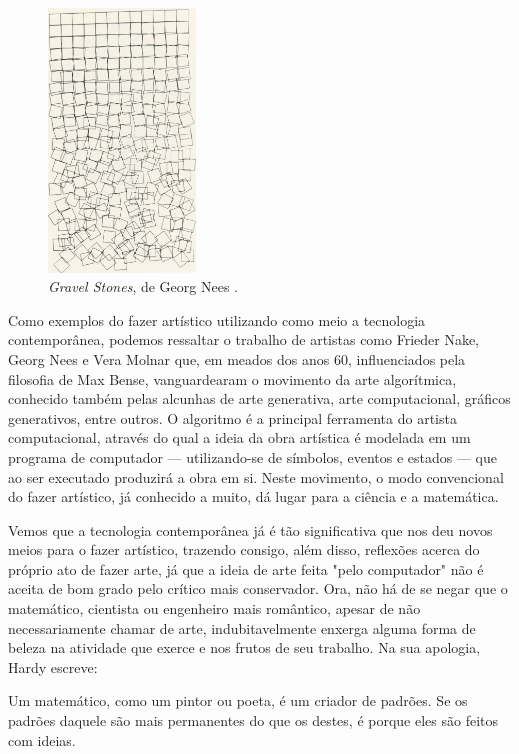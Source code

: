 \documentclass[12pt, a4paper]{article}
\begin{document}
\begin{figure}[ht!]
	\centering
	\includegraphics[width=\textwidth, height=7cm, keepaspectratio=true]{fig/gravel_stones}
	\caption{
		\emph{Gravel Stones}, de Georg Nees
		\cite{gravel_stones}.
	}
\end{figure}

Como exemplos do fazer artístico utilizando como meio a tecnologia contemporânea, podemos ressaltar o trabalho
de artistas como Frieder Nake, Georg Nees e Vera Molnar que, em meados dos anos 60, influenciados pela filosofia de Max Bense, vanguardearam 
o movimento da arte algorítmica, conhecido também pelas alcunhas de arte generativa, arte computacional, gráficos generativos, entre outros.
O algoritmo é a principal ferramenta do artista computacional, através do qual a ideia da obra artística é modelada em um programa de computador --- utilizando-se de símbolos, eventos e estados --- que ao ser executado produzirá a obra em si. Neste movimento, o modo convencional do fazer artístico, já conhecido a muito, dá lugar para a ciência e a matemática. 

Vemos que a tecnologia contemporânea já é tão significativa que nos deu novos meios para o fazer artístico, trazendo consigo, além disso, reflexões acerca do próprio ato de fazer arte, já que a ideia de arte feita "pelo computador" não é aceita de bom grado pelo crítico
mais conservador.
Ora, não há de se negar que o matemático, cientista ou engenheiro mais romântico, apesar de não necessariamente chamar de arte, indubitavelmente enxerga alguma forma de beleza na atividade que exerce e nos frutos de seu trabalho. 
Na sua apologia, Hardy \cite{hardy_apology} escreve:

\begin{displayquote}
Um matemático, como um pintor ou poeta, é um criador de padrões. Se os padrões daquele são mais permanentes do que os destes, é porque eles são feitos com ideias.
\end{displayquote}
\end{document}

